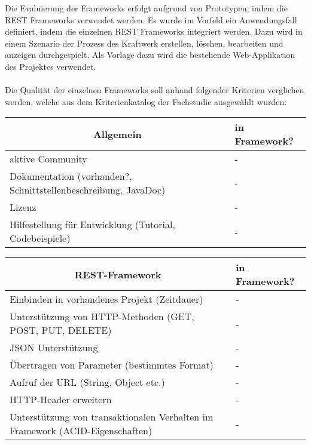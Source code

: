 \documentclass[a4paper,11pt,german,public]{INSOexpose}
\begin{document}
Die Evaluierung der Frameworks erfolgt aufgrund von Prototypen, indem die REST Frameworks verwendet werden. Es wurde im Vorfeld ein Anwendungsfall definiert, indem die einzelnen REST Frameworks  integriert werden. Dazu wird in einem Szenario der Prozess des Kraftwerk erstellen, löschen, bearbeiten und anzeigen durchgespielt. Als Vorlage dazu wird die bestehende Web-Applikation des Projektes verwendet.
\\\\
Die Qualität der einzelnen Frameworks soll anhand folgender Kriterien verglichen werden, welche aus dem Kriterienkatalog der Fachstudie\cite{vergleich13} ausgewählt wurden:
\begin{spacing}{1.4}
\begin{longtable}{|p{.7 \linewidth}|p{.2 \linewidth}|}
	\hline
	\multicolumn{1}{|c|}{\textbf{Allgemein}} & \textbf{in Framework?} \\ 
	\hline \hline 
	aktive Community & - \\ 
	\hline
	Dokumentation \newline (vorhanden?, Schnittstellenbeschreibung, JavaDoc) & - \\ 
	\hline
	Lizenz & - \\
	\hline
	Hilfestellung für Entwicklung \newline (Tutorial, Codebeispiele) & - \\
	\hline
\end{longtable}
\begin{longtable}{|p{.7 \linewidth}|p{.2 \linewidth}|}
	\hline
	\multicolumn{1}{|c|}{\textbf{REST-Framework}} & \textbf{in Framework?} \\ 
	\hline \hline 
	Einbinden in vorhandenes Projekt (Zeitdauer) & - \\
	\hline
	Unterstützung von HTTP-Methoden \newline (GET, POST, PUT, DELETE) & - \\
	\hline 
	JSON Unterstützung & - \\
	\hline
	Übertragen von Parameter (bestimmtes Format) & - \\
	\hline
	Aufruf der URL (String, Object etc.) & - \\
	\hline
	HTTP-Header erweitern & - \\
	\hline
	Unterstützung von transaktionalen Verhalten im Framework (ACID-Eigenschaften)  & - \\
	\hline
\end{longtable}
\begin{longtable}{|p{.7 \linewidth}|p{.2 \linewidth}|}

\end{longtable}
\end{spacing}
\end{document}
